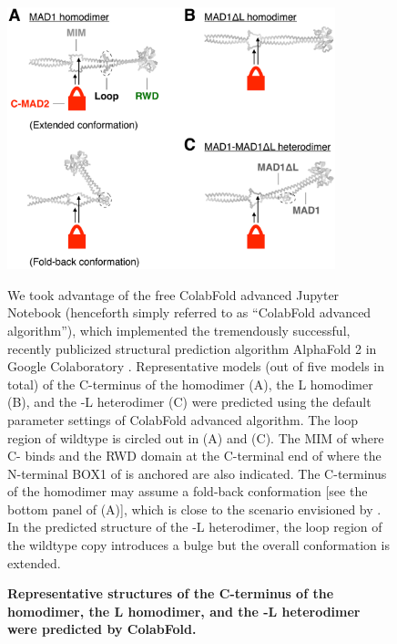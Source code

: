 \begin{figure}
    \centering
    \includegraphics[width=0.85\textwidth]{chapters/figures/ColabFoldPrediction.pdf}
    \caption{\textbf{Representative structures of the C-terminus of the  homodimer, the \textDelta{}L homodimer, and the -\textDelta{}L heterodimer were predicted by ColabFold.}}
    \noindent\justifying We took advantage of the free ColabFold advanced Jupyter Notebook (henceforth simply referred to as ``ColabFold advanced algorithm''), which implemented the tremendously successful, recently publicized structural prediction algorithm AlphaFold 2 in Google Colaboratory \cite{ColabFold, AlphaFold}. Representative models (out of five models in total) of the C-terminus of the  homodimer (A), the \textDelta{}L homodimer (B), and the -\textDelta{}L heterodimer (C) were predicted using the default parameter settings of ColabFold advanced algorithm. The loop region of wildtype  is circled out in (A) and (C). The MIM of  where C- binds and the RWD domain at the C-terminal end of  where the N-terminal BOX1 of  is anchored are also indicated. The C-terminus of the  homodimer may assume a fold-back conformation [see the bottom panel of (A)], which is close to the scenario envisioned by \cite{SpMad1}. In the predicted structure of the -\textDelta{}L heterodimer, the loop region of the wildtype copy introduces a bulge but the overall conformation is extended. 
    \label{ColabFoldPrediction}
\end{figure}

